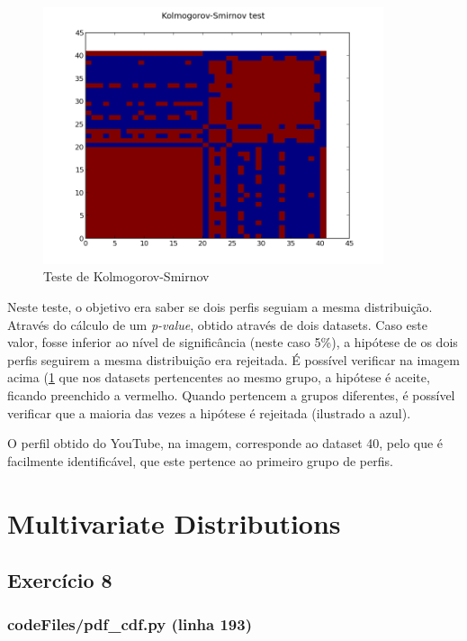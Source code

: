 \documentclass[pdftex,12pt,a4paper]{report}
\begin{document}
\begin{figure}[!htb]
\center
 \includegraphics[width=100mm,scale=1]{hellingerDist/Kolmogorov-Smirnov_test.png}
 \caption{Teste de Kolmogorov-Smirnov}
 \label{fig:kolmogorov}
\end{figure}

Neste teste, o objetivo era saber se dois perfis seguiam a mesma distribuição. Através do cálculo de um \textit{p-value}, obtido através de dois datasets. Caso este valor, fosse inferior ao nível de significância (neste caso 5\%), a hipótese de os dois perfis seguirem a mesma distribuição era rejeitada. É possível verificar na imagem acima (\ref{fig:kolmogorov} que nos datasets pertencentes ao mesmo grupo, a hipótese é aceite, ficando preenchido a vermelho. Quando pertencem a grupos diferentes, é possível verificar que a maioria das vezes a hipótese é rejeitada (ilustrado a azul).

O perfil obtido do YouTube, na imagem, corresponde ao dataset 40, pelo que é facilmente identificável, que este pertence ao primeiro grupo de perfis.

\newpage
\section{Multivariate Distributions}
\subsection{Exercício 8}
\subsubsection{codeFiles/pdf\_cdf.py (linha 193)}
\end{document}
